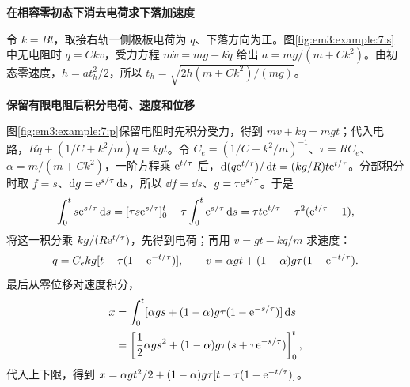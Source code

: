 \begin{solution}\textbf{在相容零初态下消去电荷求下落加速度}\par\nobreak
令 $k=Bl$，取接右轨一侧极板电荷为 $q$、下落方向为正。图\ref{fig:em3:example:7:s}中无电阻时 $q=Ckv$，受力方程 $m\dot v=mg-k\dot q$ 给出 $a=mg/(m+Ck^2)$。由初态零速度，$h=at_h^2/2$，所以 $t_h=\sqrt{2h(m+Ck^2)/(mg)}$。



\par\medskip{}\noindent\textbf{保留有限电阻后积分电荷、速度和位移}\par\nobreak
图\ref{fig:em3:example:7:p}保留电阻时先积分受力，得到 $mv+kq=mgt$；代入电路，$R\dot q+(1/C+k^2/m)q=kgt$。令 $C_e=(1/C+k^2/m)^{-1}$、$\tau=RC_e$、$\alpha=m/(m+Ck^2)$，一阶方程乘 $\mathrm e^{t/\tau}$ 后，$\mathop{}\!\mathrm d(q\mathrm e^{t/\tau})/\mathop{}\!\mathrm d t=(kg/R)t\mathrm e^{t/\tau}$。分部积分时取 $f=s$、$\mathop{}\!\mathrm d g=\mathrm e^{s/\tau}\mathop{}\!\mathrm d s$，所以 $\dd f=\dd s$、$g=\tau\mathrm e^{s/\tau}$。于是
\[
\int_0^t s\mathrm e^{s/\tau}\mathop{}\!\mathrm d s
=[\tau s\mathrm e^{s/\tau}]_0^t-\tau\int_0^t\mathrm e^{s/\tau}\mathop{}\!\mathrm d s
=\tau t\mathrm e^{t/\tau}-\tau^2(\mathrm e^{t/\tau}-1),
\]
将这一积分乘 $kg/(R\mathrm e^{t/\tau})$，先得到电荷；再用 $v=gt-kq/m$ 求速度：
\[
 q=C_ekg[t-\tau(1-\mathrm e^{-t/\tau})],\qquad
 v=\alpha gt+(1-\alpha)g\tau(1-\mathrm e^{-t/\tau}).
\]
最后从零位移对速度积分，
\[
 \begin{aligned}
 x&=\int_0^t[\alpha gs+(1-\alpha)g\tau(1-\mathrm e^{-s/\tau})]\mathop{}\!\mathrm d s\\
 &=\left[\frac12\alpha gs^2+(1-\alpha)g\tau
 (s+\tau\mathrm e^{-s/\tau})\right]_0^t,
 \end{aligned}
\]
代入上下限，得到
$x=\alpha gt^2/2+(1-\alpha)g\tau[t-\tau(1-\mathrm e^{-t/\tau})]$。




\end{solution}
